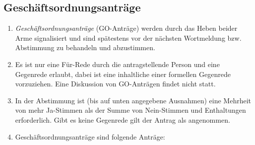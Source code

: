 \documentclass[
  a4paper,
  oneside]{scrartcl}
\providecommand{\tightlist}{%
  \setlength{\itemsep}{0pt}\setlength{\parskip}{0pt}}
\begin{document}
\hypertarget{geschuxe4ftsordnungsantruxe4ge}{%
\subsection{Geschäftsordnungsanträge}\label{geschuxe4ftsordnungsantruxe4ge}}

\begin{enumerate}
\def\labelenumi{\arabic{enumi}.}
\tightlist
\item
  \emph{Geschäftsordnungsanträge} (GO-Anträge) werden durch das Heben
  beider Arme signalisiert und sind spätestens vor der nächsten
  Wortmeldung bzw. Abstimmung zu behandeln und abzustimmen.
\item
  Es ist nur eine Für-Rede durch die antragstellende Person und eine
  Gegenrede erlaubt, dabei ist eine inhaltliche einer formellen
  Gegenrede vorzuziehen. Eine Diskussion von GO-Anträgen findet nicht
  statt.
\item
  In der Abstimmung ist (bis auf unten angegebene Ausnahmen) eine
  Mehrheit von mehr Ja-Stimmen als der Summe von Nein-Stimmen und
  Enthaltungen erforderlich. Gibt es keine Gegenrede gilt der Antrag als
  angenommen.
\item
  Geschäftsordnungsanträge sind folgende Anträge:


\end{enumerate}
\end{document}
